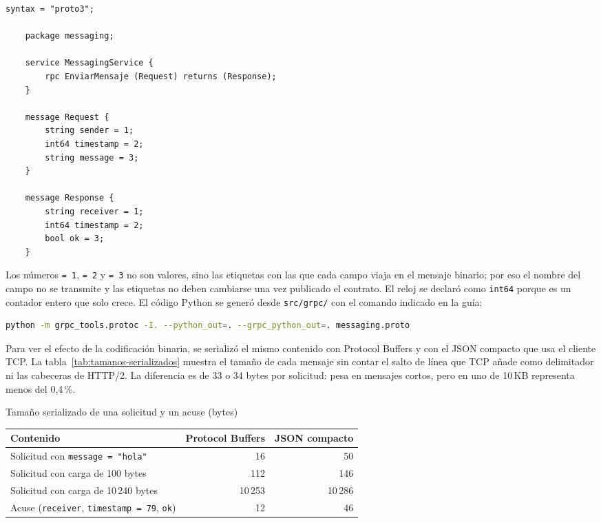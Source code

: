 \begin{lstlisting}[caption={Contrato \texttt{src/grpc/messaging.proto}}]
	syntax = "proto3";
	
	package messaging;
	
	service MessagingService {
		rpc EnviarMensaje (Request) returns (Response);
	}
	
	message Request {
		string sender = 1;
		int64 timestamp = 2;
		string message = 3;
	}
	
	message Response {
		string receiver = 1;
		int64 timestamp = 2;
		bool ok = 3;
	}
\end{lstlisting}

Los números \texttt{= 1}, \texttt{= 2} y \texttt{= 3} no son valores, sino las etiquetas con las que cada campo viaja en el mensaje binario; por eso el nombre del campo no se transmite y las etiquetas no deben cambiarse una vez publicado el contrato. El reloj se declaró como \texttt{int64} porque es un contador entero que solo crece. El código Python se generó desde \texttt{src/grpc/} con el comando indicado en la guía:

\begin{lstlisting}[language=bash,caption={Generación del código a partir del contrato}]
	python -m grpc_tools.protoc -I. --python_out=. --grpc_python_out=. messaging.proto
\end{lstlisting}

Para ver el efecto de la codificación binaria, se serializó el mismo contenido con Protocol Buffers y con el JSON compacto que usa el cliente TCP. La tabla~\ref{tab:tamanos-serializados} muestra el tamaño de cada mensaje sin contar el salto de línea que TCP añade como delimitador ni las cabeceras de HTTP/2. La diferencia es de 33 o 34 bytes por solicitud: pesa en mensajes cortos, pero en uno de 10\,KB representa menos del 0,4\,\%.

\par\medskip
\noindent\begin{minipage}{\linewidth}
	\centering
	\makeatletter{}\makeatother
	\caption{Tamaño serializado de una solicitud y un acuse (bytes)}
	\label{tab:tamanos-serializados}
	\begin{tabular}{@{}lrr@{}}
		\toprule
		Contenido & Protocol Buffers & JSON compacto \\
		\midrule
		Solicitud con \texttt{message = "hola"} & 16 & 50 \\
		Solicitud con carga de 100 bytes & 112 & 146 \\
		Solicitud con carga de 10\,240 bytes & 10\,253 & 10\,286 \\
		Acuse (\texttt{receiver}, \texttt{timestamp = 79}, \texttt{ok}) & 12 & 46 \\
		\bottomrule
	\end{tabular}
\end{minipage}
\par\medskip

